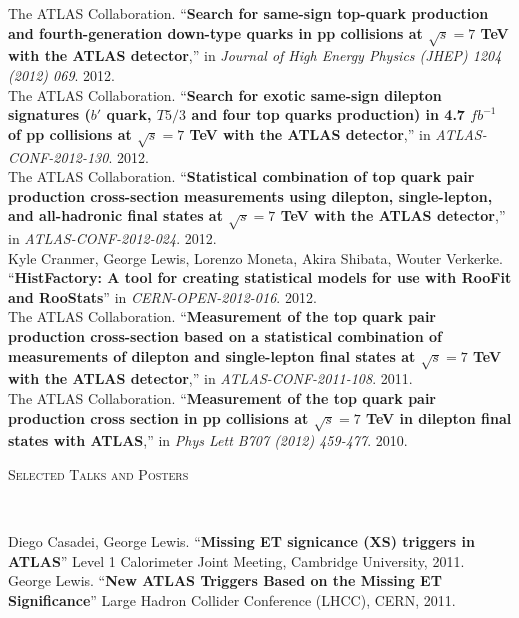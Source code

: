 \documentclass[9pt]{article}
\newenvironment{changemargin}[2]{%
  \begin{list}{}{%
    \setlength{\topsep}{0pt}%
    \setlength{\leftmargin}{#1}%
    \setlength{\rightmargin}{#2}%
    \setlength{\listparindent}{\parindent}%
    \setlength{\itemindent}{\parindent}%
    \setlength{\parsep}{\parskip}%
  }%
  \item[]}{\end{list}
}
\newcommand{\lineover}{
	\begin{changemargin}{-0.05in}{-0.05in}
		\vspace*{-8pt}
		\hrulefill \\
		\vspace*{-2pt}
	\end{changemargin}
}
\newcommand{\header}[1]{
	\begin{changemargin}{-0.5in}{-0.5in}
		\scshape{#1}\\
  	\lineover
	\end{changemargin}
}
\newenvironment{body} {
	\vspace*{-16pt}
	\begin{changemargin}{-0.25in}{-0.5in}
  }	
	{\end{changemargin}
}
\begin{document}
\begin{body}
  \vspace{14pt}
  The ATLAS Collaboration. ``\textbf{Search for same-sign top-quark production and fourth-generation down-type quarks in pp collisions at $\sqrt{s}=7$ TeV with the ATLAS detector},'' in \emph{Journal of High Energy Physics (JHEP) 1204 (2012) 069}. 2012.\\
  \medskip
  The ATLAS Collaboration. ``\textbf{Search for exotic same-sign dilepton signatures ($b'$ quark, $T5/3$ and four top quarks production) in 4.7 $fb^{-1}$ of pp collisions at $\sqrt{s}=7$ TeV with the ATLAS detector},'' in \emph{ATLAS-CONF-2012-130}. 2012.\\
  \medskip
  The ATLAS Collaboration.  ``\textbf{Statistical combination of top quark pair production cross-section measurements using dilepton, single-lepton, and all-hadronic final states at $\sqrt{s}=7$ TeV with the ATLAS detector},'' in \emph{ATLAS-CONF-2012-024}. 2012. \\
  \medskip
  Kyle Cranmer, George Lewis, Lorenzo Moneta, Akira Shibata, Wouter Verkerke.  ``\textbf{HistFactory: A tool for creating statistical models for use with RooFit and RooStats}'' in \emph{CERN-OPEN-2012-016}. 2012. \\
  \medskip
  The ATLAS Collaboration.  ``\textbf{Measurement of the top quark pair production cross-section based on a statistical combination of measurements of dilepton and single-lepton final states at $\sqrt{s}=7$ TeV with the ATLAS detector},'' in \emph{ATLAS-CONF-2011-108}. 2011. \\
  \medskip
  The ATLAS Collaboration. ``\textbf{Measurement of the top quark pair production cross section in pp collisions at $\sqrt{s}=7$ TeV in dilepton final states with ATLAS},'' in \emph{Phys Lett B707 (2012) 459-477}. 2010.\\
\end{body}

\smallskip


\header{Selected Talks and Posters}
\begin{body}
	\vspace{14pt}
        Diego Casadei, George Lewis. ``\textbf{Missing ET signicance (XS) triggers in ATLAS}'' Level 1 Calorimeter Joint Meeting, Cambridge University, 2011. \\
        \medskip
        George Lewis.  ``\textbf{New ATLAS Triggers Based on the Missing ET Significance}'' Large Hadron Collider Conference (LHCC), CERN, 2011. \\
\end{body}
\end{document}
